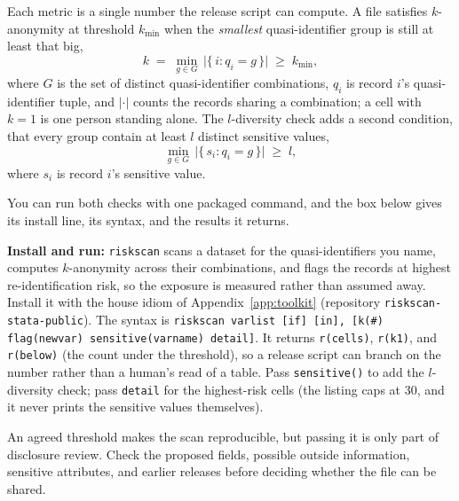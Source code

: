 Each metric is a single number the release script can compute. A file satisfies $k$-anonymity at threshold $k_{\min}$ when the \emph{smallest} quasi-identifier group is still at least that big,
\[
  k \;=\; \min_{g \in G}\, \bigl|\{\, i : q_i = g \,\}\bigr| \;\ge\; k_{\min},
\]
where $G$ is the set of distinct quasi-identifier combinations, $q_i$ is record $i$'s quasi-identifier tuple, and $\lvert\cdot\rvert$ counts the records sharing a combination; a cell with $k=1$ is one person standing alone. The $l$-diversity check adds a second condition, that every group contain at least $l$ distinct sensitive values,
\[
  \min_{g \in G}\, \bigl|\{\, s_i : q_i = g \,\}\bigr| \;\ge\; l,
\]
where $s_i$ is record $i$'s sensitive value.

You can run both checks with one packaged command, and the box below gives its install line, its syntax, and the results it returns.

\begin{kaobox}[frametitle=Package Integration: \texttt{riskscan}]
\textbf{Install and run:} \texttt{riskscan} scans a dataset for the quasi-identifiers you name, computes $k$-anonymity across their combinations, and flags the records at highest re-identification risk, so the exposure is measured rather than assumed away. Install it with the house idiom of Appendix~\ref{app:toolkit} (repository \texttt{riskscan-stata-public}).
The syntax is \texttt{riskscan varlist [if] [in], [k(\#) flag(newvar) sensitive(varname) detail]}. It returns \texttt{r(cells)}, \texttt{r(k1)}, and \texttt{r(below)} (the count under the threshold), so a release script can branch on the number rather than a human's read of a table. Pass \texttt{sensitive()} to add the $l$-diversity check; pass \texttt{detail} for the highest-risk cells (the listing caps at 30, and it never prints the sensitive values themselves).
\end{kaobox}

An agreed threshold makes the scan reproducible, but passing it is only part of disclosure review. Check the proposed fields, possible outside information, sensitive attributes, and earlier releases before deciding whether the file can be shared. 

